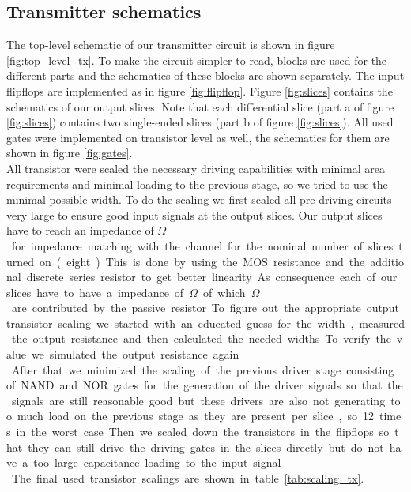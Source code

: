 \subsection{Transmitter schematics}

The top-level schematic of our transmitter circuit is shown in figure \ref{fig:top_level_tx}. To make the circuit simpler to read, blocks are used for the different parts and the schematics of these blocks are shown separately. The input flipflops are implemented as in figure \ref{fig:flipflop}. Figure \ref{fig:slices} contains the schematics of our output slices. Note that each differential slice (part a of figure \ref{fig:slices}) contains two single-ended slices (part b of figure \ref{fig:slices}). All used gates were implemented on transistor level as well, the schematics for them are shown in figure \ref{fig:gates}.\\
All transistor were scaled the necessary driving capabilities with minimal area requirements and minimal loading to the previous stage, so we tried to use the minimal possible width. To do the scaling we first scaled all pre-driving circuits very large to ensure good input signals at the output slices. Our output slices have to reach an impedance of \unit[50]{$\Omega$} for impedance matching with the channel for the nominal number of slices turned on (eight). This is done by using the MOS resistance and the additional discrete series resistor to get better linearity. As consequence each of our slices have to have a impedance of \unit[400]{$\Omega$} of which \unit[300]{$\Omega$} are contributed by the passive resistor. To figure out the appropriate output transistor scaling we started with an educated guess for the width, measured the output resistance and then calculated the needed widths. To verify the value we simulated the output resistance again.\\
After that we minimized the scaling of the previous driver stage consisting of NAND and NOR gates for the generation of the driver signals so that the signals are still reasonable good but these drivers are also not generating too much load on the previous stage as they are present per slice, so 12 times in the worst case. Then we scaled down the transistors in the flipflops so that they can still drive the driving gates in the slices directly but do not have a too large capacitance loading to the input signal.\\
The final used transistor scalings are shown in table \ref{tab:scaling_tx}.


